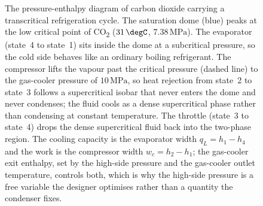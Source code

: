 \begin{figure}[htbp]
\caption[Pressure-enthalpy diagram of a CO\textsubscript{2} transcritical
cycle]{The pressure-enthalpy diagram of carbon dioxide carrying a
transcritical refrigeration cycle. The saturation dome (blue) peaks at the
low critical point of CO\textsubscript{2} ($31\,\degC$, $7.38\,\text{MPa}$).
The evaporator (state~4 to state~1) sits inside the dome at a subcritical
pressure, so the cold side behaves like an ordinary boiling refrigerant.
The compressor lifts the vapour past the critical pressure (dashed line) to
the gas-cooler pressure of $10\,\text{MPa}$, so heat rejection from state~2
to state~3 follows a supercritical isobar that never enters the dome and
never condenses; the fluid cools as a dense supercritical phase rather than
condensing at constant temperature. The throttle (state~3 to state~4) drops
the dense supercritical fluid back into the two-phase region. The cooling
capacity is the evaporator width $q_L=h_1-h_4$ and the work is the
compressor width $w_c=h_2-h_1$; the gas-cooler exit enthalpy, set by the
high-side pressure and the gas-cooler outlet temperature, controls both,
which is why the high-side pressure is a free variable the designer
optimises rather than a quantity the condenser fixes.}
\label{fig:vol04ch02:co2-transcritical-cycle}
\end{figure}
